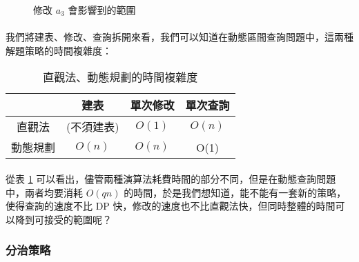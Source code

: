 \documentclass[12pt,a4paper,oneside]{report}
\begin{document}
\begin{CJK}{UTF8}{bkai}
\begin{figure}[h]
\centering
{}
\caption{修改 $a_3$ 會影響到的範圍}
\label{tree:fig:rsq:dynamic}
\end{figure}

\paragraph{}我們將建表、修改、查詢拆開來看，我們可以知道在動態區間查詢問題中，這兩種解題策略的時間複雜度：

\begin{table}[h]
\centering
\begin{tabular}{c|ccc}
& 建表 & 單次修改 & 單次查詢\\
\hline
\hline
直觀法 & (不須建表) & $O(1)$ & $O(n)$\\
動態規劃 & $O(n)$ & $O(n)$ & O(1)
\end{tabular}
\caption{直觀法、動態規劃的時間複雜度}
\label{tree:tab:rsq:time}
\end{table}

\paragraph{}從表 \ref{tree:tab:rsq:time} 可以看出，儘管兩種演算法耗費時間的部分不同，但是在動態查詢問題中，兩者均要消耗 $O(qn)$ 的時間，於是我們想知道，能不能有一套新的策略，使得查詢的速度不比 DP 快，修改的速度也不比直觀法快，但同時整體的時間可以降到可接受的範圍呢？

\subsubsection{分治策略}


\end{CJK}
\end{document}
